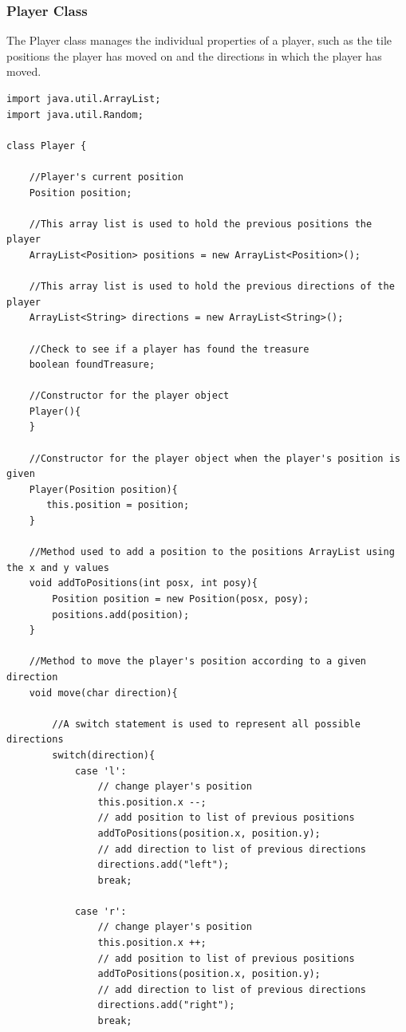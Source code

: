 \documentclass[a4paper,12pt]{extarticle}
\begin{document}
\subsubsection{Player Class}


The Player class manages the individual properties of a player, such as the tile positions the player has moved on and the directions in which the player has moved.

\begin{lstlisting}[caption=The initial code of the Player class]
import java.util.ArrayList;
import java.util.Random;

class Player {

    //Player's current position
    Position position;

    //This array list is used to hold the previous positions the player
    ArrayList<Position> positions = new ArrayList<Position>();

    //This array list is used to hold the previous directions of the player
    ArrayList<String> directions = new ArrayList<String>();

    //Check to see if a player has found the treasure
    boolean foundTreasure;

    //Constructor for the player object
    Player(){
    }

    //Constructor for the player object when the player's position is given
    Player(Position position){
       this.position = position;
    }

    //Method used to add a position to the positions ArrayList using the x and y values
    void addToPositions(int posx, int posy){
        Position position = new Position(posx, posy);
        positions.add(position);
    }

    //Method to move the player's position according to a given direction
    void move(char direction){

        //A switch statement is used to represent all possible directions
        switch(direction){
            case 'l':
                // change player's position
                this.position.x --;
                // add position to list of previous positions
                addToPositions(position.x, position.y);
                // add direction to list of previous directions
                directions.add("left");
                break;

            case 'r':
                // change player's position
                this.position.x ++;
                // add position to list of previous positions
                addToPositions(position.x, position.y);
                // add direction to list of previous directions
                directions.add("right");
                break;


\end{lstlisting}
\end{document}
